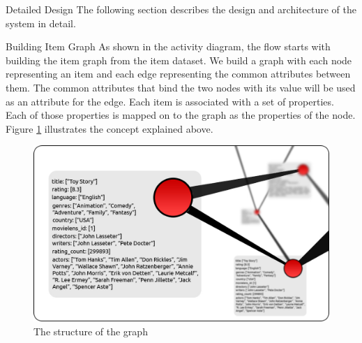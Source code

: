 \documentclass{report}
\begin{document}
\begin{projChapter}{Detailed Design}
        The following section describes the design and architecture of the system in detail.
        \begin{projSection}{Building Item Graph}
            As shown in the activity diagram, the flow starts with building the item graph from the item dataset. We build a graph with each node representing an item and each edge representing the common attributes between them. The common attributes that bind the two nodes with its value will be used as an attribute for the edge. Each item is associated with a set of properties.  Each of those properties is mapped on to the graph as the properties of the node. Figure \ref{node} illustrates the concept explained above.
            \begin{figure}[ht!]
\centering
\includegraphics[scale=0.4]{images/node.png}
\caption{The structure of the graph}
\label{node}
\end{figure}


\end{projSection}
\end{projChapter}
\end{document}
